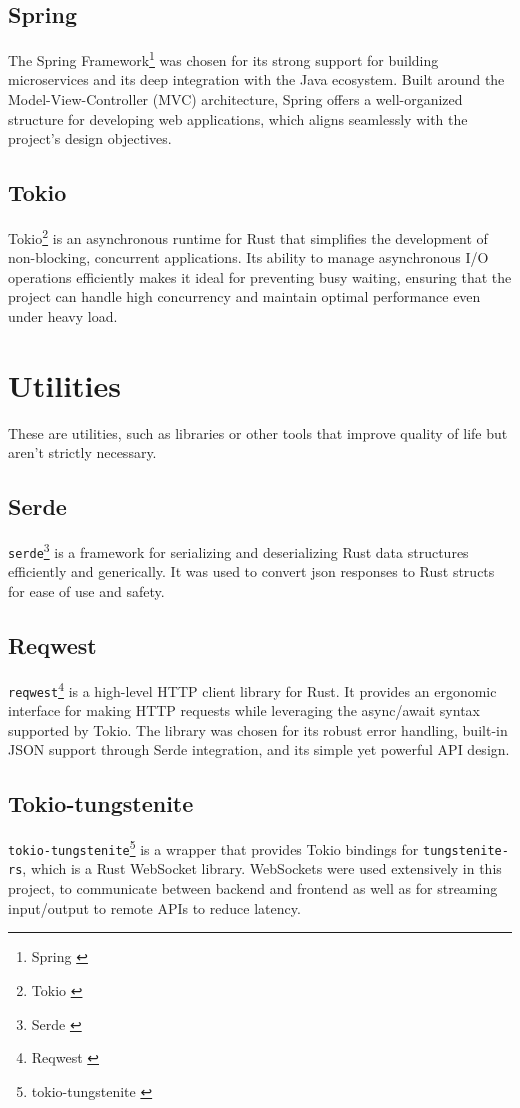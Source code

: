 \subsection{Spring}
The Spring Framework\footnote{Spring \cite{spring}} was chosen for its
strong support for building microservices
and its deep integration with the Java ecosystem.
Built around the Model-View-Controller (MVC) architecture,
Spring offers a well-organized structure
for developing web applications, which aligns seamlessly with
the project's design objectives.

\subsection{Tokio}
Tokio\footnote{Tokio \cite{tokio}} is an asynchronous runtime for Rust
that simplifies the development of non-blocking, concurrent applications.
Its ability to manage asynchronous I/O operations efficiently makes it
ideal for preventing busy waiting,
ensuring that the project can handle high concurrency and maintain
optimal performance even under heavy load.

\section{Utilities}
These are utilities, such as libraries or other tools that improve quality of life but aren't strictly necessary.

\subsection{Serde}
\texttt{serde}\footnote{Serde \cite{serde}} is a framework for serializing and deserializing Rust data structures efficiently and generically.
It was used to convert json responses to Rust structs for ease of use and safety.

\subsection{Reqwest}
\texttt{reqwest}\footnote{Reqwest \cite{reqwest}} is a high-level HTTP client library for Rust.
It provides an ergonomic interface for making HTTP requests while leveraging the async/await syntax supported by Tokio.
The library was chosen for its robust error handling, built-in JSON support through Serde integration, and its simple yet powerful API design.

\subsection{Tokio-tungstenite}
\texttt{tokio-tungstenite}\footnote{tokio-tungstenite \cite{tokio-tungstenite}} is a wrapper that provides Tokio bindings for \texttt{tungstenite-rs},
which is a Rust WebSocket library. WebSockets were used extensively in this project, to communicate between backend and frontend as well as
for streaming input/output to remote APIs to reduce latency.


